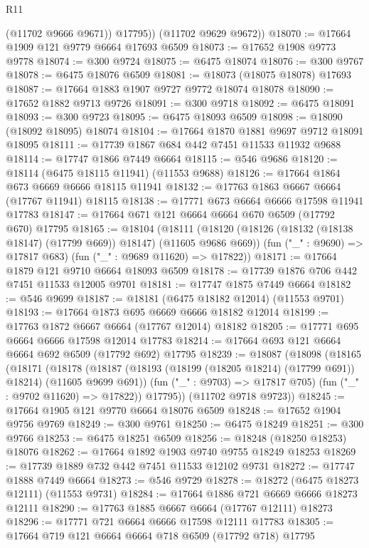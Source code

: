 \begin{lexlean}{R11}
\begin{coremodule}
{{{{{{{{{{{{{{{{{{{{{{{{{{{{{{{{{{{{{{{{{{{{{{{{{{{{{{{{{{{{{{{{{{{{{{{{{{{{{{{{{{            (@11702 @9666 @9671))
          @17795))
      (@11702 @9629 @9672))
@18070 := @17664 @1909 @121 @9779 @6664 @17693 @6509
@18073 := @17652 @1908 @9773 @9778
@18074 := @300 @9724
@18075 := @6475 @18074
@18076 := @300 @9767
@18078 := @6475 @18076 @6509
@18081 := @18073 (@18075 @18078) @17693
@18087 := @17664 @1883 @1907 @9727 @9772 @18074 @18078
@18090 := @17652 @1882 @9713 @9726
@18091 := @300 @9718
@18092 := @6475 @18091
@18093 := @300 @9723
@18095 := @6475 @18093 @6509
@18098 := @18090 (@18092 @18095) @18074
@18104 := @17664 @1870 @1881 @9697 @9712 @18091 @18095
@18111 := @17739 @1867 @684 @442 @7451 @11533 @11932 @9688
@18114 := @17747 @1866 @7449 @6664
@18115 := @546 @9686
@18120 := @18114 (@6475 @18115 @11941) (@11553 @9688)
@18126 := @17664 @1864 @673 @6669 @6666 @18115 @11941
@18132 := @17763 @1863 @6667 @6664 (@17767 @11941) @18115
@18138 := @17771 @673 @6664 @6666 @17598 @11941 @17783
@18147 := @17664 @671 @121 @6664 @6664 @670 @6509 (@17792 @670) @17795
@18165 := @18104
    (@18111
      (@18120 (@18126 (@18132 (@18138 @18147) (@17799 @669)) @18147) (@11605 @9686 @669))
      (fun ("_" : @9690) => @17817 @683)
      (fun ("_" : @9689 @11620) => @17822))
@18171 := @17664 @1879 @121 @9710 @6664 @18093 @6509
@18178 := @17739 @1876 @706 @442 @7451 @11533 @12005 @9701
@18181 := @17747 @1875 @7449 @6664
@18182 := @546 @9699
@18187 := @18181 (@6475 @18182 @12014) (@11553 @9701)
@18193 := @17664 @1873 @695 @6669 @6666 @18182 @12014
@18199 := @17763 @1872 @6667 @6664 (@17767 @12014) @18182
@18205 := @17771 @695 @6664 @6666 @17598 @12014 @17783
@18214 := @17664 @693 @121 @6664 @6664 @692 @6509 (@17792 @692) @17795
@18239 := @18087
    (@18098
      (@18165
        (@18171
          (@18178
            (@18187 (@18193 (@18199 (@18205 @18214) (@17799 @691)) @18214) (@11605 @9699 @691))
            (fun ("_" : @9703) => @17817 @705)
            (fun ("_" : @9702 @11620) => @17822))
          @17795))
      (@11702 @9718 @9723))
@18245 := @17664 @1905 @121 @9770 @6664 @18076 @6509
@18248 := @17652 @1904 @9756 @9769
@18249 := @300 @9761
@18250 := @6475 @18249
@18251 := @300 @9766
@18253 := @6475 @18251 @6509
@18256 := @18248 (@18250 @18253) @18076
@18262 := @17664 @1892 @1903 @9740 @9755 @18249 @18253
@18269 := @17739 @1889 @732 @442 @7451 @11533 @12102 @9731
@18272 := @17747 @1888 @7449 @6664
@18273 := @546 @9729
@18278 := @18272 (@6475 @18273 @12111) (@11553 @9731)
@18284 := @17664 @1886 @721 @6669 @6666 @18273 @12111
@18290 := @17763 @1885 @6667 @6664 (@17767 @12111) @18273
@18296 := @17771 @721 @6664 @6666 @17598 @12111 @17783
@18305 := @17664 @719 @121 @6664 @6664 @718 @6509 (@17792 @718) @17795
}}}}}}}}}}}}}}}}}}}}}}}}}}}}}}}}}}}}}}}}}}}}}}}}}}}}}}}}}}}}}}}}}}}}}}}}}}}}}}}}}}
\end{coremodule}
\end{lexlean}

